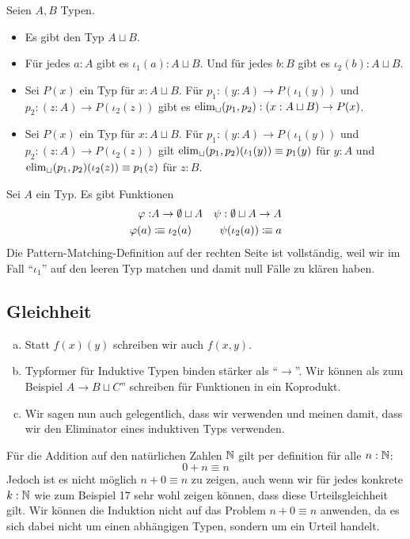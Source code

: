 \begin{regeln}
Seien $A,B$ Typen.
\begin{itemize}
\item Es gibt den Typ $A\sqcup B$.
\item Für jedes $a:A$ gibt es $\iota_1(a):A\sqcup B$.
  Und für jedes $b:B$ gibt es $\iota_2(b):A\sqcup B$.
\item Sei $P(x)$ ein Typ für $x:A\sqcup B$.
  Für $p_1:(y:A)\to P(\iota_1(y))$ und $p_2:(z:A)\to P(\iota_2(z))$
  gibt es $\mathrm{elim}_\sqcup(p_1,p_2):(x:A\sqcup B)\to P(x)$.
\item Sei $P(x)$ ein Typ für $x:A\sqcup B$.
  Für $p_1:(y:A)\to P(\iota_1(y))$ und $p_2:(z:A)\to P(\iota_2(z))$
  gilt $\mathrm{elim}_\sqcup(p_1,p_2)(\iota_1(y))\equiv p_1(y)$ für $y:A$
  und  $\mathrm{elim}_\sqcup(p_1,p_2)(\iota_2(z))\equiv p_1(z)$ für $z:B$.
\end{itemize}
\end{regeln}

\begin{bemerkung}
Sei $A$ ein Typ. Es gibt Funktionen
  \begin{align*}
    \varphi: &A\to \emptyset\sqcup A &\psi:\emptyset\sqcup A \to A \\
    \varphi(a)&\vcentcolon\mspace{-1.2mu}\equiv \iota_2(a) &\psi(\iota_2(a))\vcentcolon\mspace{-1.2mu}\equiv a 
\end{align*}
Die Pattern-Matching-Definition auf der rechten Seite ist vollständig, weil wir im Fall ``$\iota_1$'' auf den leeren Typ matchen und damit null Fälle zu klären haben.
\end{bemerkung}

\subsection{Gleichheit}
\begin{konvention}
\begin{enumerate}[(a)]
\item Statt $f(x)(y)$ schreiben wir auch $f(x,y)$.
\item Typformer für Induktive Typen binden stärker als ``$\to$''. Wir können als zum Beispiel $A\to B\sqcup C$'' schreiben für Funktionen in ein Koprodukt.
\item Wir sagen nun auch gelegentlich, dass wir  verwenden und meinen damit, dass wir den Eliminator eines induktiven Typs verwenden.
\end{enumerate}
\end{konvention}

Für die Addition auf den natürlichen Zahlen $\mathbb{N}$ gilt per definition für alle $n:\mathbb{N}$:
\[
  0+n\equiv n
\]
Jedoch ist es nicht möglich $n+0\equiv n$ zu zeigen, auch wenn wir für jedes konkrete $k:\mathbb{N}$ wie zum Beispiel 17 sehr wohl zeigen können, dass diese Urteilsgleichheit gilt.
Wir können die Induktion nicht auf das Problem $n+0\equiv n$ anwenden, da es sich dabei nicht um einen abhängigen Typen, sondern um ein Urteil handelt.

